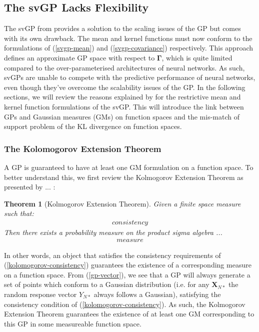 \documentclass{article}
\newtheorem{theorem}{Theorem}
\numberwithin{equation}{section}
\begin{document}
\subsection{The svGP Lacks Flexibility}\label{section:svgp-problems}
The svGP from \cite{titsias2009variational} provides a solution to the scaling issues of the GP but comes with its own drawback. The mean and kernel functions must now conform to the formulations of (\ref{svgp-mean}) and (\ref{svgp-covariance}) respectively. This approach defines an approximate GP space with respect to $\mathbf{\Gamma}$, which is quite limited compared to the over-parameterised architectures of neural networks. As such, svGPs are unable to compete with the predictive performance of neural networks, even though they've overcome the scalability issues of the GP. In the following sections, we will review the reasons explained by \cite{matthews2016sparse} for the restrictive mean and kernel function formulations of the svGP. This will introduce the link between GPs and Gaussian measures (GMs) on function spaces and the mis-match of support problem of the KL divergence on function spaces. 

\subsubsection{The Kolomogorov Extension Theorem}
A GP is guaranteed to have at least one GM formulation on a function space. To better understand this, we first review the Kolmogorov Extension Theorem as presented by ... :
\begin{theorem}[Kolmogorov Extension Theorem]
\label{kolomogorov-extension-theorem}
Given a finite space measure such that:
\begin{align}
    consistency 
    \label{kolomogorov-consistency}
\end{align}
Then there exists a probability measure on the product sigma algebra ... 
\begin{align}
    measure
    \label{kolomogorov-measure}
\end{align}
\end{theorem}
In other words, an object that satisfies the consistency requirements of (\ref{kolomogorov-consistency}) guarantees the existence of a corresponding measure on a function space. From (\ref{gp-vector}), we see that a GP will always generate a set of points which conform to a Gaussian distribution (i.e. for any $\mathbf{X}_{N*}$ the random response vector $Y_{N*}$ always follows a Gaussian), satisfying the consistency condition of (\ref{kolomogorov-consistency}). As such, the Kolmogorov Extension Theorem guarantees the existence of at least one GM corresponding to this GP in some measureable function space. 
\end{document}

